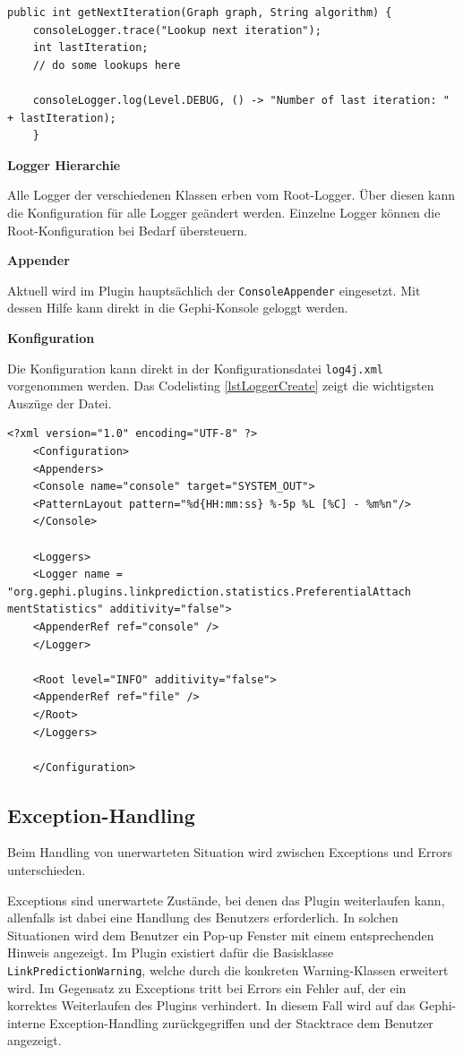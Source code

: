 \begin{lstlisting}[caption={Log-Einträge erzeugen},label=lstLoggerUse]
    public int getNextIteration(Graph graph, String algorithm) {
    consoleLogger.trace("Lookup next iteration");
    int lastIteration;
    // do some lookups here

    consoleLogger.log(Level.DEBUG, () -> "Number of last iteration: " + lastIteration);
    }
\end{lstlisting}

\textbf{Logger Hierarchie}

Alle Logger der verschiedenen Klassen erben vom Root-Logger. Über diesen kann die Konfiguration für alle Logger geändert werden.
Einzelne Logger können die Root-Konfiguration bei Bedarf übersteuern.

\textbf{Appender}

Aktuell wird im Plugin hauptsächlich der \texttt{ConsoleAppender} eingesetzt.
Mit dessen Hilfe kann direkt in die Gephi-Konsole geloggt werden.

\textbf{Konfiguration}

Die Konfiguration kann direkt in der Konfigurationsdatei \texttt{log4j.xml} vorgenommen werden.
Das Codelisting \ref{lstLoggerCreate} zeigt die wichtigsten Auszüge der Datei.

\begin{lstlisting}[caption={log4j.xml},label=lstLoggerCreate]
    <?xml version="1.0" encoding="UTF-8" ?>
    <Configuration>
    <Appenders>
    <Console name="console" target="SYSTEM_OUT">
    <PatternLayout pattern="%d{HH:mm:ss} %-5p %L [%C] - %m%n"/>
    </Console>

    <Loggers>
    <Logger name = "org.gephi.plugins.linkprediction.statistics.PreferentialAttach mentStatistics" additivity="false">
    <AppenderRef ref="console" />
    </Logger>

    <Root level="INFO" additivity="false">
    <AppenderRef ref="file" />
    </Root>
    </Loggers>

    </Configuration>
\end{lstlisting}

\subsection{Exception-Handling}
\label{exceptionhandling}

Beim Handling von unerwarteten Situation wird zwischen Exceptions und Errors unterschieden.

Exceptions sind unerwartete Zustände, bei denen das Plugin weiterlaufen kann, allenfalls ist dabei eine Handlung des Benutzers erforderlich.
In solchen Situationen wird dem Benutzer ein Pop-up Fenster mit einem entsprechenden Hinweis angezeigt.
Im Plugin existiert dafür die Basisklasse \texttt{LinkPredictionWarning}, welche durch die konkreten Warning-Klassen erweitert wird.
Im Gegensatz zu Exceptions tritt bei Errors ein Fehler auf, der ein korrektes Weiterlaufen des Plugins verhindert.
In diesem Fall wird auf das Gephi-interne Exception-Handling zurückgegriffen und der Stacktrace dem Benutzer angezeigt.

